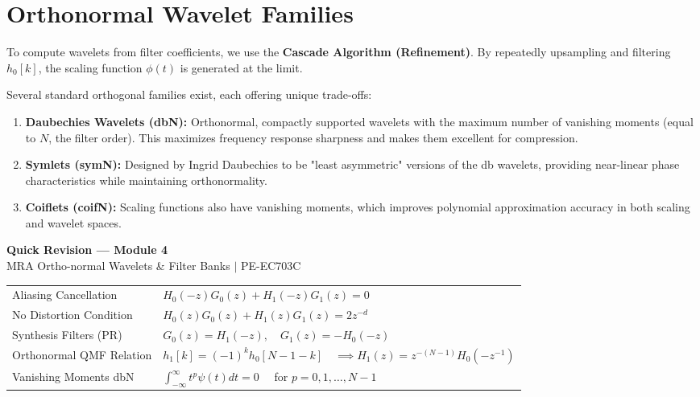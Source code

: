 \documentclass[12pt,a4paper]{article}
\renewcommand{\arraystretch}{1.45}
\begin{document}
\section{Orthonormal Wavelet Families}

To compute wavelets from filter coefficients, we use the \textbf{Cascade Algorithm (Refinement)}. By repeatedly upsampling and filtering $h_0[k]$, the scaling function $\phi(t)$ is generated at the limit.

Several standard orthogonal families exist, each offering unique trade-offs:
\begin{enumerate}[leftmargin=*, itemsep=4pt]
  \item \textbf{Daubechies Wavelets (dbN):} Orthonormal, compactly supported wavelets with the maximum number of vanishing moments (equal to $N$, the filter order). This maximizes frequency response sharpness and makes them excellent for compression.
  \item \textbf{Symlets (symN):} Designed by Ingrid Daubechies to be "least asymmetric" versions of the db wavelets, providing near-linear phase characteristics while maintaining orthonormality.
  \item \textbf{Coiflets (coifN):} Scaling functions also have vanishing moments, which improves polynomial approximation accuracy in both scaling and wavelet spaces.
\end{enumerate}

\newpage
\begin{center}
  {\large\bfseries\color{myred} Quick Revision --- Module 4}\\[3pt]
  {\small\color{mydark} MRA Ortho-normal Wavelets \& Filter Banks $|$ PE-EC703C}
\end{center}
\noindent{\color{myred}\rule{\linewidth}{1.2pt}}
\vspace{4pt}

\begin{tcolorbox}[formulabox, title={\textbf{Key Filter Bank Equations}}]
\renewcommand{\arraystretch}{1.35}
\begin{tabularx}{\linewidth}{B{5.0cm} X}
Aliasing Cancellation & $H_0(-z)G_0(z) + H_1(-z)G_1(z) = 0$ \\[4pt]
No Distortion Condition & $H_0(z)G_0(z) + H_1(z)G_1(z) = 2z^{-d}$ \\[4pt]
Synthesis Filters (PR) & $G_0(z) = H_1(-z), \quad G_1(z) = -H_0(-z)$ \\[4pt]
Orthonormal QMF Relation & $h_1[k] = (-1)^k h_0[N - 1 - k] \quad \implies H_1(z) = z^{-(N-1)}H_0(-z^{-1})$ \\[4pt]
Vanishing Moments dbN & $\int_{-\infty}^{\infty} t^p \psi(t) dt = 0 \quad$ for $p = 0, 1, \dots, N-1$
\end{tabularx}
\end{tcolorbox}
\end{document}
